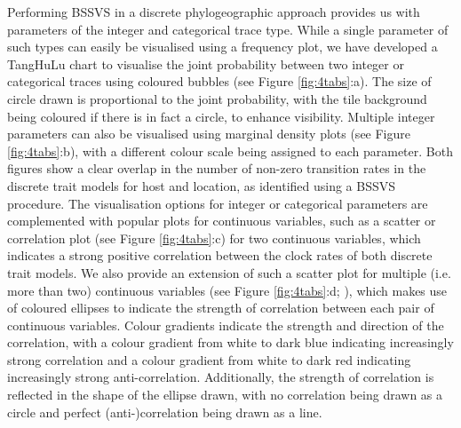 \documentclass{bioinfo}
\begin{document}
Performing BSSVS in a discrete phylogeographic approach provides us with parameters of the integer and categorical trace type.
While a single parameter of such types can easily be visualised using a frequency plot, we have developed a TangHuLu chart to visualise the joint probability between two integer or categorical traces using coloured bubbles (see Figure \ref{fig:4tabs}:a).
The size of circle drawn is proportional to the joint probability, %
with the tile background being coloured if there is in fact a circle, to enhance visibility.
Multiple integer parameters can also be visualised using marginal density plots (see Figure \ref{fig:4tabs}:b), with a different colour scale being assigned to each parameter.
Both figures show a clear overlap in the number of non-zero transition rates in the discrete trait models for host and location, as identified using a BSSVS procedure.
The visualisation options for integer or categorical parameters are complemented with popular plots for continuous variables, such as a scatter or correlation plot (see Figure \ref{fig:4tabs}:c) for two continuous variables, which indicates a strong positive correlation between the clock rates of both discrete trait models.
We also provide an extension of such a scatter plot for multiple (i.e. more than two) continuous variables (see Figure \ref{fig:4tabs}:d; \citet{Murdoch}), which makes use of coloured ellipses to indicate the strength of correlation between each pair of continuous variables.
Colour gradients indicate the strength and direction of the correlation, with a colour gradient from white to dark blue indicating increasingly strong correlation and a colour gradient from white to dark red indicating increasingly strong anti-correlation.
Additionally, the strength of correlation is reflected in the shape of the ellipse drawn, with no correlation being drawn as a circle and perfect (anti-)correlation being drawn as a line.
\end{document}
